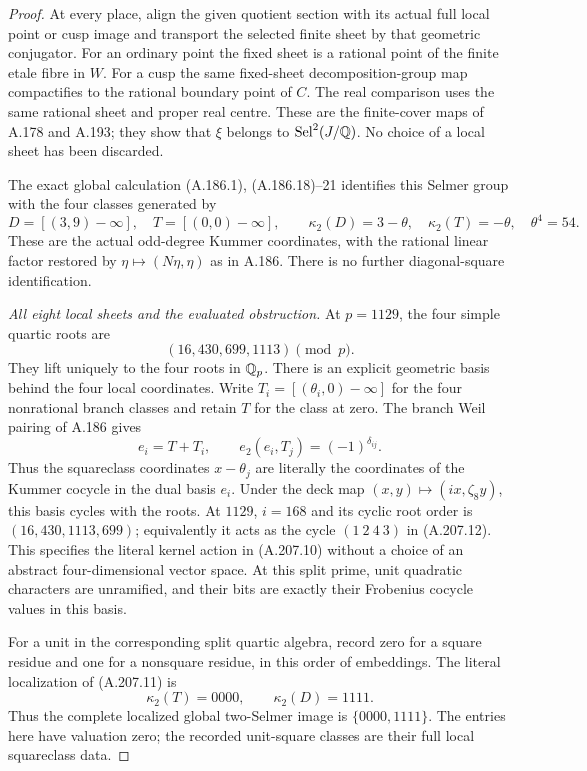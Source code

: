 \begin{proof}
At every place, align the given quotient section with its
actual full local point or cusp image and transport the
selected finite sheet by that geometric conjugator.
For an ordinary point the fixed sheet is a rational point
of the finite etale fibre in \(W\).  For a cusp the same
fixed-sheet decomposition-group map compactifies to the
rational boundary point of \(C\).  The real comparison
uses the same rational sheet and proper real centre.
These are the finite-cover maps of A.178 and A.193; they
show that \(\xi\) belongs to \(\operatorname{Sel}^2(J/\mathbb Q)\).
No choice of a local sheet has been discarded.

The exact global calculation (A.186.1), (A.186.18)--21
identifies this Selmer group with the four classes generated
by
\[
 D=[(3,9)-\infty],\quad T=[(0,0)-\infty],\qquad
 \kappa_2(D)=3-\theta,\quad\kappa_2(T)=-\theta,
                         \quad\theta^4=54.
\tag{A.207.11}
\]
These are the actual odd-degree Kummer coordinates, with
the rational linear factor restored by
\(\eta\mapsto(N\eta,\eta)\) as in A.186.
There is no further diagonal-square identification.

\emph{All eight local sheets and the evaluated obstruction.}
At \(p=1129\), the four simple quartic roots are
\[
                 (16,430,699,1113)\pmod p.
\tag{A.207.12}
\]
They lift uniquely to the four roots in \(\mathbb Q_p\).
There is an explicit geometric basis behind the four
local coordinates.  Write \(T_i=[(\theta_i,0)-\infty]\)
for the four nonrational branch classes and retain \(T\)
for the class at zero.  The branch Weil pairing of A.186
gives
\[
 e_i=T+T_i,\qquad e_2(e_i,T_j)=(-1)^{\delta_{ij}}.
\tag{A.207.13}
\]
Thus the squareclass coordinates \(x-\theta_j\) are
literally the coordinates of the Kummer cocycle in the
dual basis \(e_i\).  Under the deck map
\((x,y)\mapsto(ix,\zeta_8y)\), this basis cycles with
the roots.  At \(1129\), \(i=168\) and its cyclic root
order is \((16,430,1113,699)\); equivalently it acts
as the cycle \((1\ 2\ 4\ 3)\) in (A.207.12).
This specifies the literal kernel action in (A.207.10)
without a choice of an abstract four-dimensional vector
space.  At this split prime, unit quadratic characters
are unramified, and their bits are exactly their
Frobenius cocycle values in this basis.

For a unit in the corresponding split quartic algebra,
record zero for a square residue and one for a nonsquare
residue, in this order of embeddings.  The literal
localization of (A.207.11) is
\[
                 \kappa_2(T)=0000,\qquad
                 \kappa_2(D)=1111.
\tag{A.207.14}
\]
Thus the complete localized global two-Selmer image is
\(\{0000,1111\}\).  The entries here have valuation zero;
the recorded unit-square classes are their full local
squareclass data.


\end{proof}
